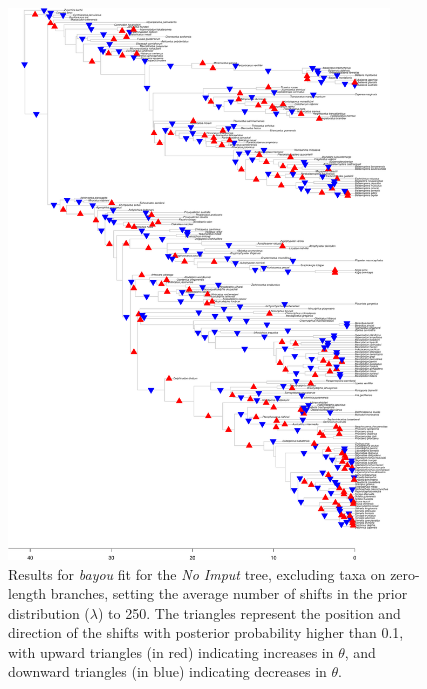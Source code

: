 \begin{figure}[H]
\includegraphics[width=0.9\textwidth]{img/plots-noimput-k250-1.pdf}
\caption{Results for \textit{bayou} fit for the \textit{No Imput} tree, excluding taxa on zero-length branches, setting the average number of shifts in the prior distribution ($\lambda$) to 250. The triangles represent the position and direction of the shifts with posterior probability higher than 0.1, with upward triangles (in red) indicating increases in $\theta$, and downward triangles (in blue) indicating decreases in $\theta$.}
\label{fig:noimput-k250-nzlb}
\end{figure}

\newpage

